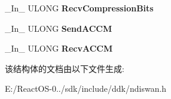 \begin{DoxyCompactItemize}
\+\_\+\+In\+\_\+ U\+L\+O\+NG {\bfseries Recv\+Compression\+Bits}
\item 
\mbox{\label{struct___n_d_i_s___w_a_n___c_o___s_e_t___l_i_n_k___i_n_f_o_acba1b01eee536abce1b98e85343bbabd}} 
\+\_\+\+In\+\_\+ U\+L\+O\+NG {\bfseries Send\+A\+C\+CM}
\item 
\mbox{\label{struct___n_d_i_s___w_a_n___c_o___s_e_t___l_i_n_k___i_n_f_o_a5548338afc0b84d790c7000fdf98e8f9}} 
\+\_\+\+In\+\_\+ U\+L\+O\+NG {\bfseries Recv\+A\+C\+CM}
\end{DoxyCompactItemize}


该结构体的文档由以下文件生成\+:\begin{DoxyCompactItemize}
\item 
E\+:/\+React\+O\+S-\/0../sdk/include/ddk/ndiswan.\+h\end{DoxyCompactItemize}
